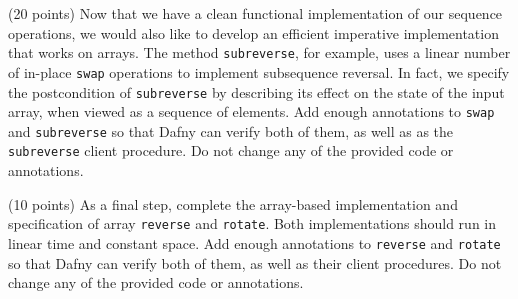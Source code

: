 \documentclass{handout}
\begin{document}
\begin{questions}
\item (20 points) Now that we have a clean functional implementation of our
sequence operations, we would also like to develop an efficient imperative
implementation that works on arrays.  The method \lstinline{subreverse}, for
example, uses a linear number of in-place \lstinline{swap} operations to
implement subsequence reversal. In fact, we specify the postcondition of
\lstinline{subreverse} by describing its effect on the state of the input array,
when viewed as a sequence of elements. Add enough annotations to
\lstinline{swap} and \lstinline{subreverse} so that Dafny can verify both of
them, as well as as the \lstinline{subreverse} client procedure.  Do not change
any of the provided code or annotations.



\item (10 points)  \label{prob:dafny-last} As a final step, complete the
array-based implementation and specification of array \lstinline{reverse} and
\lstinline{rotate}. Both implementations should run in linear time and constant
space.  Add enough annotations to \lstinline{reverse} and \lstinline{rotate} so
that Dafny can verify both of them, as well as their client procedures.  Do not
change any of the provided code or annotations.



\end{questions}
\end{document}
